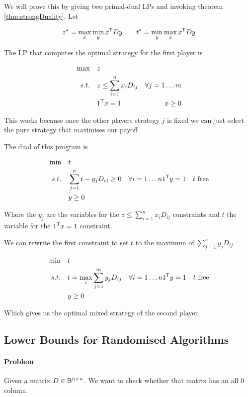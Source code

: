\begin{pr} We will prove this by giving two primal-dual LPs and invoking theorem \ref{thm:strongDuality}. Let

\[z^* = \max_x \min_y {x}^\text{\upshape \sffamily T} Dy \qquad t^*= \min_y\max_x {x}^\text{\upshape \sffamily T} D y\]

The LP that computes the optimal strategy for the first player is

\begin{align*}
\max \quad & z\\
s.t.\quad & z \leq \sum_{i=1}^n x_i D_{ij} & \forall j=1\ldots m\\
&{1}^\text{\upshape \sffamily T} x = 1
&x\geq 0
\end{align*}

This works because once the other players strategy $j$ is fixed we can just select the pure strategy that maximises our payoff.

The dual of this program is

\begin{align*}
\min \quad & t \\
s.t.\quad & \sum_{j=1}^n t-y_jD_{ij}  \geq 0 & \forall i=1\ldots n
& {1}^\text{\upshape \sffamily T} y = 1
&t \text{ free}\\
&y\geq 0
\end{align*}

Where the $y_j$ are the variables for the $z \leq \sum_{i=1}^n x_i D_{ij}$ constraints and $t$ the variable for the ${1}^\text{\upshape \sffamily T} x=1$ constraint. 

We can rewrite the first constraint to set $t$ to the maximum of $\sum_{j=1}^n y_jD_{ij}$

\begin{align*}
\min \quad & t \\
s.t.\quad & t = \max_i \sum^m_{j=1} y_j D_{ij} & \forall i=1\ldots n
& {1}^\text{\upshape \sffamily T} y = 1
&t \text{ free}\\
&y\geq 0
\end{align*}

Which gives us the optimal mixed strategy of the second player.
\end{pr}

\subsection{Lower Bounds for Randomised Algorithms}

\paragraph{Problem} Given a matrix $D\in \mathbb{B}^{n\times n}$. We want to check whether that matrix has an all 0 column. 

